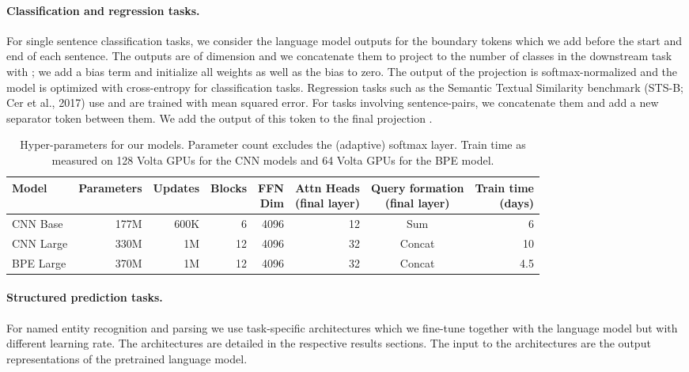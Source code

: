 \documentclass[11pt,a4paper]{article}
\begin{document}
\paragraph{Classification and regression tasks.}
For single sentence classification tasks, we consider the language model outputs for the boundary tokens  which we add before the start and end of each sentence.
The outputs are of dimension  and we concatenate them to project to the number of classes  in the downstream task with  \citep{radford2018unsup};
we add a bias term  and initialize all weights as well as the bias to zero.
The output of the projection is softmax-normalized and the model is optimized with cross-entropy for classification tasks. 
Regression tasks such as the Semantic Textual Similarity benchmark (STS-B; Cer et al., 2017)\nocite{cer2017stsb} use  and are trained with mean squared error.
For tasks involving sentence-pairs, we concatenate them and add a new separator token  between them. 
We add the output of this token to the final projection .

\begin{table*}[t]
\centering
\begin{tabular}{lrrrrrcr}
\toprule
\bf Model & \bf Parameters & \bf Updates & \bf Blocks & \bf \thead{FFN\\ Dim} & \bf \thead{Attn Heads\\ (final layer)} & \bf \thead{Query formation\\ (final layer)} & \bf \thead{Train time\\ (days)} \\ \midrule
CNN Base & 177M & 600K & 6 & 4096 & 12 & Sum & 6 \\
CNN Large & 330M & 1M & 12 & 4096 & 32 & Concat & 10 \\
BPE Large & 370M & 1M & 12 & 4096 & 32 & Concat & 4.5 \\
\bottomrule
\end{tabular}
\caption{Hyper-parameters for our models. Parameter count excludes the (adaptive) softmax layer. Train time as measured on 128 Volta GPUs for the CNN models and 64 Volta GPUs for the BPE model.}
\label{tab:model_params}
\end{table*}


\paragraph{Structured prediction tasks.}
For named entity recognition and parsing we use task-specific architectures which we fine-tune together with the language model but with different learning rate.  
The architectures are detailed in the respective results sections.
The input to the architectures are the output representations of the pretrained language model.
\end{document}
